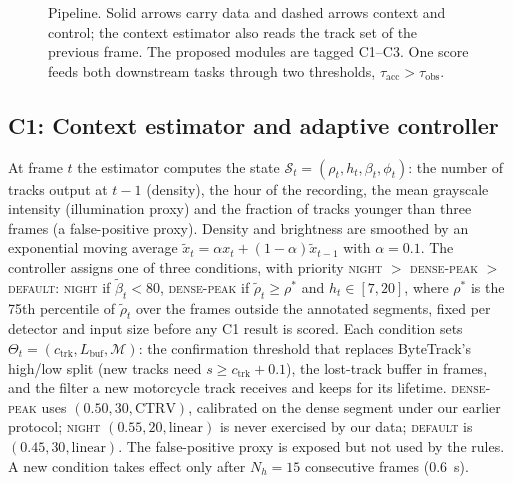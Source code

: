 \documentclass[twocolumn]{svjour3}
\begin{document}
\begin{figure}[t]
\caption{Pipeline. Solid arrows carry data and dashed arrows context and control;
the context estimator also reads the track set of the previous frame. The
proposed modules are tagged C1--C3. One score feeds both downstream tasks
through two thresholds, $\tau_{\mathrm{acc}}>\tau_{\mathrm{obs}}$.}
\label{fig:pipeline}
\end{figure}

\subsection{C1: Context estimator and adaptive controller}\label{sec:c1}

At frame $t$ the estimator computes the state
$\mathcal{S}_t=(\rho_t,h_t,\beta_t,\phi_t)$: the number of tracks output at $t-1$
(density), the hour of the recording, the mean grayscale intensity (illumination
proxy) and the fraction of tracks younger than three frames (a false-positive
proxy). Density and brightness are smoothed by an exponential moving average
$\tilde{x}_t=\alpha x_t+(1-\alpha)\tilde{x}_{t-1}$ with $\alpha=0.1$. The
controller assigns one of three conditions, with priority \textsc{night} $>$
\textsc{dense-peak} $>$ \textsc{default}: \textsc{night} if $\tilde\beta_t<80$,
\textsc{dense-peak} if $\tilde\rho_t\ge\rho^{*}$ and $h_t\in[7,20]$, where
$\rho^{*}$ is the 75th percentile of $\tilde\rho_t$ over the frames outside the
annotated segments, fixed per detector and input size before any C1 result is
scored. Each condition
sets $\Theta_t=(c_{\mathrm{trk}},L_{\mathrm{buf}},\mathcal{M})$: the confirmation
threshold that replaces ByteTrack's high/low split (new tracks need
$s\ge c_{\mathrm{trk}}+0.1$), the lost-track buffer in frames, and the filter a
new motorcycle track receives and keeps for its lifetime. \textsc{dense-peak}
uses $(0.50,30,\text{CTRV})$, calibrated on the dense segment under our earlier
protocol; \textsc{night} $(0.55,20,\text{linear})$ is
never exercised by our data; \textsc{default} is $(0.45,30,\text{linear})$. The false-positive proxy is
exposed but not used by the rules. A new condition takes effect only after
$N_h=15$ consecutive frames (0.6~s).
\end{document}
